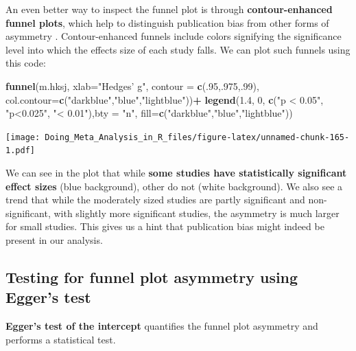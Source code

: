 \documentclass[]{book}
\newenvironment{Shaded}{\begin{snugshade}}{\end{snugshade}}
\newcommand{\DataTypeTok}[1]{\textcolor[rgb]{0.13,0.29,0.53}{#1}}
\newcommand{\DecValTok}[1]{\textcolor[rgb]{0.00,0.00,0.81}{#1}}
\newcommand{\FloatTok}[1]{\textcolor[rgb]{0.00,0.00,0.81}{#1}}
\newcommand{\KeywordTok}[1]{\textcolor[rgb]{0.13,0.29,0.53}{\textbf{#1}}}
\newcommand{\NormalTok}[1]{#1}
\newcommand{\OperatorTok}[1]{\textcolor[rgb]{0.81,0.36,0.00}{\textbf{#1}}}
\newcommand{\StringTok}[1]{\textcolor[rgb]{0.31,0.60,0.02}{#1}}
\begin{document}
An even better way to inspect the funnel plot is through \textbf{contour-enhanced funnel plots}, which help to distinguish publication bias from other forms of asymmetry \citep{peters2008contour}. Contour-enhanced funnels include colors signifying the significance level into which the effects size of each study falls. We can plot such funnels using this code:

\begin{Shaded}
\begin{Highlighting}[]
\KeywordTok{funnel}\NormalTok{(m.hksj, }\DataTypeTok{xlab=}\StringTok{"Hedges' g"}\NormalTok{, }
       \DataTypeTok{contour =} \KeywordTok{c}\NormalTok{(.}\DecValTok{95}\NormalTok{,.}\DecValTok{975}\NormalTok{,.}\DecValTok{99}\NormalTok{),}
       \DataTypeTok{col.contour=}\KeywordTok{c}\NormalTok{(}\StringTok{"darkblue"}\NormalTok{,}\StringTok{"blue"}\NormalTok{,}\StringTok{"lightblue"}\NormalTok{))}\OperatorTok{+}
\KeywordTok{legend}\NormalTok{(}\FloatTok{1.4}\NormalTok{, }\DecValTok{0}\NormalTok{, }\KeywordTok{c}\NormalTok{(}\StringTok{"p < 0.05"}\NormalTok{, }\StringTok{"p<0.025"}\NormalTok{, }\StringTok{"< 0.01"}\NormalTok{),}\DataTypeTok{bty =} \StringTok{"n"}\NormalTok{,}
       \DataTypeTok{fill=}\KeywordTok{c}\NormalTok{(}\StringTok{"darkblue"}\NormalTok{,}\StringTok{"blue"}\NormalTok{,}\StringTok{"lightblue"}\NormalTok{))}
\end{Highlighting}
\end{Shaded}

\texttt{[image: Doing\_Meta\_Analysis\_in\_R\_files/figure-latex/unnamed-chunk-165-1.pdf]}

We can see in the plot that while \textbf{some studies have statistically significant effect sizes} (blue background), other do not (white background). We also see a trend that while the moderately sized studies are partly significant and non-significant, with slightly more significant studies, the asymmetry is much larger for small studies. This gives us a hint that publication bias might indeed be present in our analysis.

\hypertarget{testing-for-funnel-plot-asymmetry-using-eggers-test}{%
\subsection{Testing for funnel plot asymmetry using Egger's test}\label{testing-for-funnel-plot-asymmetry-using-eggers-test}}

\textbf{Egger's test of the intercept} \citep{egger1997bias} quantifies the funnel plot asymmetry and performs a statistical test.
\end{document}

